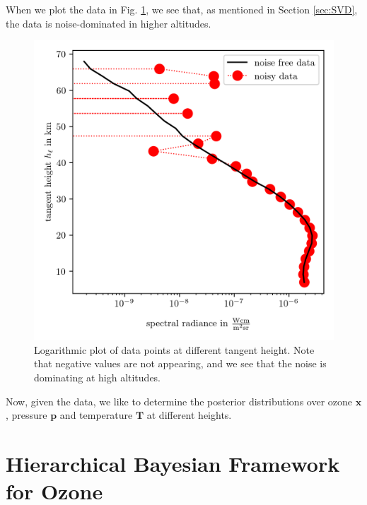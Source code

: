 When we plot the data in Fig. \ref{fig:DataPlot}, we see that, as mentioned in Section \ref{sec:SVD}, the data is noise-dominated in higher altitudes.
\begin{figure}[th!]
	\centering
	\includegraphics{DataPlot.png}
	\caption[Logarithmic plot of data points at different tangent height.]{Logarithmic plot of data points at different tangent height. Note that negative values are not appearing, and we see that the noise is dominating at high altitudes.}
	\label{fig:DataPlot}
\end{figure}
Now, given the data, we like to determine the posterior distributions over ozone $\bm{x}$, pressure $\bm{p}$ and temperature $\bm{T}$ at different heights.



\section{Hierarchical Bayesian Framework for Ozone}
\label{sec:BayModel}


